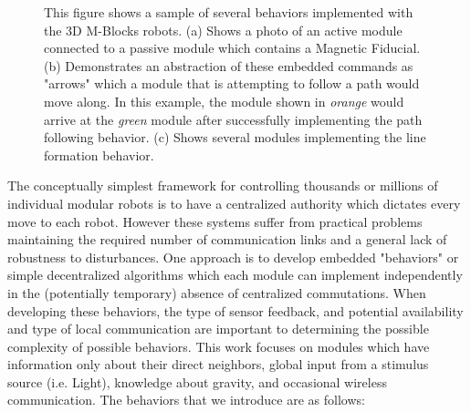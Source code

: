 \begin{figure}[t]
\begin{subfigure}[b]{\linewidth}
		\centering

	\end{subfigure}
	
	
	\caption{This figure shows a sample of several behaviors implemented with the 3D M-Blocks robots. (a) Shows a photo of an active module connected to a passive module which contains a Magnetic Fiducial. (b) Demonstrates an abstraction of these embedded commands as "arrows" which a module that is attempting to follow a path would move along. In this example, the module shown in \emph{orange} would arrive at the \emph{green} module after successfully implementing the path following behavior. (c) Shows several modules implementing the line formation behavior.}
	
	\label{fig:intro}
\end{figure}

The conceptually simplest framework for controlling thousands or millions of individual modular robots is to have a centralized authority which dictates every move to each robot. However these systems suffer from practical problems maintaining the required number of communication links and a general lack of robustness to disturbances. One approach is to develop embedded "behaviors" or simple decentralized algorithms which each module can implement independently in the (potentially temporary) absence of centralized commutations. When developing these behaviors, the type of sensor feedback, and potential availability and type of local communication are important to determining the possible complexity of possible behaviors. This work focuses on modules which have information only about their direct neighbors, global input from a stimulus source (i.e. Light), knowledge about gravity, and occasional wireless communication. The behaviors that we introduce are as follows:

